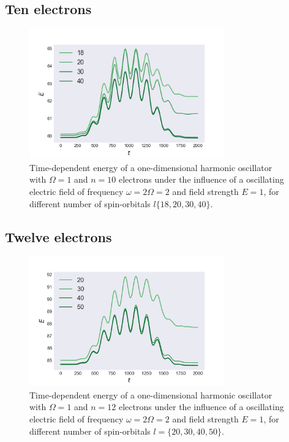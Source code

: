 \pagebreak

\subsection*{Ten electrons}

\begin{figure}[!h]
    \centering
    \includegraphics[width=0.75\textwidth]{results/figures/1D/n=10energy.png} 
    \caption{Time-dependent energy of a one-dimensional harmonic oscillator with $\Omega=1$
        and $n=10$ electrons under the influence of a oscillating electric field 
        of frequency $\omega = 2 \Omega = 2$ and field strength $E=1$, for different 
        number of spin-orbitals $l\{18,20,30,40\}$.
    }
    \label{fig:1d_n10_qd}
\end{figure}

\subsection*{Twelve electrons}

\begin{figure}[!h]
    \centering
    \includegraphics[width=0.75\textwidth]{results/figures/1D/n=12energy.png} 
    \caption{Time-dependent energy of a one-dimensional harmonic oscillator with $\Omega=1$
        and $n=12$ electrons under the influence of a oscillating electric field 
        of frequency $\omega = 2 \Omega = 2$ and field strength $E=1$, for different 
        number of spin-orbitals $l=\{20,30,40,50\}$.
    }
    \label{fig:1d_n12_qd}
\end{figure}
